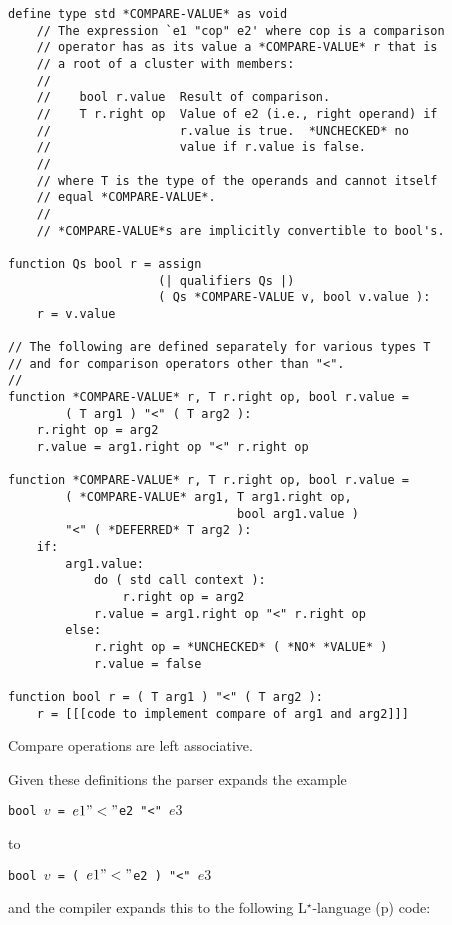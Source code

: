 \documentclass[12pt]{article}
\newcommand{\LSTAR}{L$^\star$}
\newcommand{\pagref}[1]{p\pageref{#1}}
\newenvironment{indpar}[1][0.3in]%
	{\begin{list}{}%
		     {\setlength{\itemsep}{0in}%
		      \setlength{\topsep}{0in}%
		      \setlength{\parsep}{1ex}%
		      \setlength{\labelwidth}{#1}%
		      \setlength{\leftmargin}{#1}%
		      \addtolength{\leftmargin}{\labelsep}}%
	 \item}%
	{\end{list}}
\begin{document}
\begin{indpar}\label{COMPARE-IMPLEMENTATION}\begin{verbatim}
define type std *COMPARE-VALUE* as void
    // The expression `e1 "cop" e2' where cop is a comparison
    // operator has as its value a *COMPARE-VALUE* r that is
    // a root of a cluster with members:
    //
    //    bool r.value  Result of comparison.
    //    T r.right op  Value of e2 (i.e., right operand) if
    //                  r.value is true.  *UNCHECKED* no
    //                  value if r.value is false.
    //
    // where T is the type of the operands and cannot itself
    // equal *COMPARE-VALUE*.
    //
    // *COMPARE-VALUE*s are implicitly convertible to bool's.

function Qs bool r = assign
                     (| qualifiers Qs |)
                     ( Qs *COMPARE-VALUE v, bool v.value ):
    r = v.value

// The following are defined separately for various types T
// and for comparison operators other than "<".
// 
function *COMPARE-VALUE* r, T r.right op, bool r.value =
        ( T arg1 ) "<" ( T arg2 ):
    r.right op = arg2
    r.value = arg1.right op "<" r.right op

function *COMPARE-VALUE* r, T r.right op, bool r.value =
        ( *COMPARE-VALUE* arg1, T arg1.right op,
                                bool arg1.value )
        "<" ( *DEFERRED* T arg2 ):
    if:
        arg1.value:
            do ( std call context ):
                r.right op = arg2
            r.value = arg1.right op "<" r.right op
        else:
            r.right op = *UNCHECKED* ( *NO* *VALUE* )
            r.value = false

function bool r = ( T arg1 ) "<" ( T arg2 ):
    r = [[[code to implement compare of arg1 and arg2]]]
\end{verbatim}\end{indpar}

Compare operations are left associative.

Given these definitions the parser expands the example
\begin{center}\label{COMPARE-EXAMPLE}
\tt bool $v$ = $e1 "<" $e2 "<" $e3$
\end{center}
to
\begin{center}
\tt bool $v$ = ( $e1 "<" $e2 ) "<" $e3$
\end{center}
and the compiler expands this to the following
\LSTAR-language (\pagref{LSTAR-LANGUAGE}) code:
\end{document}
